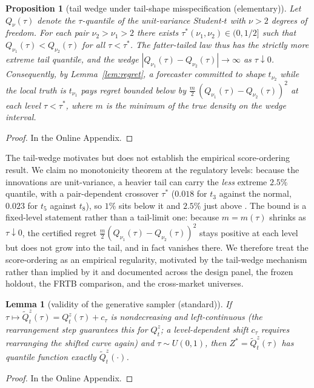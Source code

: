 \documentclass[11pt]{article}
\newtheorem{proposition}{Proposition}
\newtheorem{lemma}{Lemma}
\theoremstyle{remark}
\begin{document}
\begin{proposition}[tail wedge under tail-shape misspecification (elementary)]
\label{prop:wedge}
Let $Q_\nu(\tau)$ denote the $\tau$-quantile of the unit-variance
Student-$t$ with $\nu > 2$ degrees of freedom. For each pair
$\nu_2 > \nu_1 > 2$ there exists $\tau^*(\nu_1,\nu_2) \in (0, 1/2]$
such that $Q_{\nu_1}(\tau) < Q_{\nu_2}(\tau)$ for all $\tau < \tau^*$. The fatter-tailed law thus has the strictly more extreme tail quantile, and the wedge $|Q_{\nu_1}(\tau) - Q_{\nu_2}(\tau)| \to \infty$ as $\tau \downarrow 0$. Consequently, by Lemma~\ref{lem:regret}, a
forecaster committed to shape $t_{\nu_2}$ while the local truth is
$t_{\nu_1}$ pays regret bounded below by
$\tfrac{m}{2}\,(Q_{\nu_1}(\tau) - Q_{\nu_2}(\tau))^2$ at each level
$\tau < \tau^*$, where $m$ is the minimum of the true density on the
wedge interval.
\end{proposition}
\begin{proof} In the Online Appendix. \end{proof}

\medskip\noindent The tail-wedge motivates but does not establish the empirical score-ordering result. We claim no monotonicity theorem at the regulatory levels: because the innovations are unit-variance, a heavier tail can carry the \emph{less} extreme $2.5\%$ quantile, with a pair-dependent crossover $\tau^*$ ($0.018$ for $t_3$ against the normal, $0.023$ for $t_5$ against $t_8$), so $1\%$ sits below it and $2.5\%$ just above \citep{patton2020}. The bound is a fixed-level statement rather than a tail-limit one: because $m=m(\tau)$ shrinks as $\tau\downarrow0$, the certified regret $\tfrac{m}{2}(Q_{\nu_1}(\tau) - Q_{\nu_2}(\tau))^2$ stays positive at each level but does not grow into the tail, and in fact vanishes there. We therefore treat the score-ordering as an empirical regularity, motivated by the tail-wedge mechanism rather than implied by it and documented across the design panel, the frozen holdout, the FRTB comparison, and the cross-market universes.

\begin{lemma}[validity of the generative sampler (standard)]\label{lem:sampler}
If $\tau \mapsto \widetilde{Q}^{z}_t(\tau) = Q^{z}_t(\tau)+c_\tau$ is nondecreasing and
left-continuous (the rearrangement step guarantees this for $Q^{z}_t$; a level-dependent shift $c_\tau$ requires rearranging the shifted curve again) and
$\tau \sim U(0,1)$, then $Z^* = \widetilde{Q}^{z}_t(\tau)$ has
quantile function exactly $\widetilde{Q}^{z}_t(\cdot)$.
\end{lemma}
\begin{proof} In the Online Appendix. \end{proof}
\end{document}
